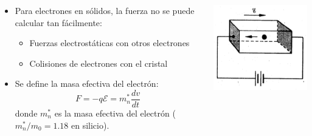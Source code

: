 \documentclass[10pt,t,aspectratio=169]{beamer}
\begin{document}
\begin{frame}[t]
\begin{columns}
    \begin{column}[]{0.8\textwidth}
    
      \begin{itemize}
        \item Para electrones en sólidos, la fuerza no se puede calcular tan fácilmente:
        \begin{itemize}
          \item Fuerzas electrostáticas con otros electrones
          \item Colisiones de electrones con el cristal
        \end{itemize}
        \item Se define la masa efectiva del electrón:
        \[ F = -q\mathcal{E} = m_n^* \dfrac{dv}{dt} \]
        donde $m_n^*$ es la masa efectiva del electrón ($m_n^*/m_0=1.18$ en silicio).
      \end{itemize}
      
    \end{column}
    
    \begin{column}[]{0.2\textwidth}
    
      \centering
      \includegraphics[width=\textwidth]{./figures/fuerza2.png}
      
    \end{column}
    
  \end{columns}
  
\end{frame}
\end{document}
